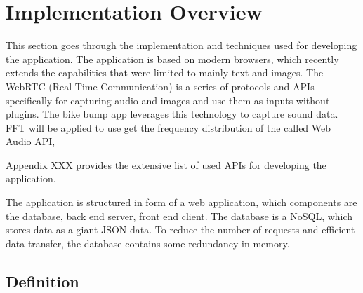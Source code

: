 \clearpage


\section{Implementation Overview}

% 

This section goes through the implementation and techniques used for developing the application. The application is based on modern browsers, which recently extends the capabilities that were limited to mainly text and images. The WebRTC (Real Time Communication) is a series of protocols and APIs specifically for capturing audio and images and use them as inputs without plugins. The bike bump app leverages this technology to capture sound data. FFT will be applied to use get the frequency distribution of the called Web Audio API, 

Appendix XXX provides the extensive list of used APIs for developing the application.

The application is structured in form of a web application, which
components are the database, back end server, front end client. The database is a NoSQL, which stores data as a giant JSON data. To reduce the number of requests and efficient data transfer, the database contains some redundancy in memory.

\subsection{Definition}

